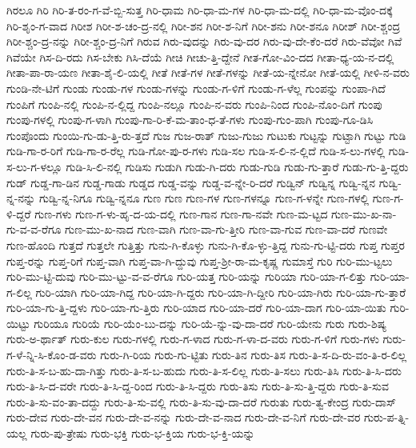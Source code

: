 {ಗಿರಲೂ
ಗಿರಿ
ಗಿರಿ-ತ-ರಂ-ಗ-ವೆ-ಬ್ಬಿ-ಸುತ್ತ
ಗಿರಿ-ಧಾಮ
ಗಿರಿ-ಧಾ-ಮ-ಗಳ
ಗಿರಿ-ಧಾ-ಮ-ದಲ್ಲಿ
ಗಿರಿ-ಧಾ-ಮ-ವೊಂ-ದಕ್ಕೆ
ಗಿರಿ-ಶೃಂ-ಗ-ವಾದ
ಗಿರೀಶ
ಗಿರೀ-ಶ-ಚಂ-ದ್ರ-ನಲ್ಲಿ
ಗಿರೀ-ಶನ
ಗಿರೀ-ಶ-ನಿಗೆ
ಗಿರೀ-ಶನು
ಗಿರೀ-ಶನೂ
ಗಿರೀಶ್
ಗಿರೀ-ಶ್ಚಂದ್ರ
ಗಿರೀ-ಶ್ಚಂ-ದ್ರ-ನನ್ನು
ಗಿರೀ-ಶ್ಚಂ-ದ್ರ-ನಿಗೆ
ಗಿರುವ
ಗಿರು-ವುದನ್ನು
ಗಿರು-ವು-ದರ
ಗಿರು-ವು-ದೇ-ಕೆಂ-ದರೆ
ಗಿರು-ವೆವೋ
ಗಿವೆ
ಗಿವೆಯೇ
ಗಿಸ-ದಿ-ರದು
ಗಿಸ-ಬೇಕು
ಗಿಸಿ-ದೆಯೆ
ಗೀಚಿ
ಗೀಚು-ತ್ತಿ-ದ್ದೇನೆ
ಗೀತ-ಗೋ-ವಿಂ-ದದ
ಗೀತಾ-ಧ್ಯ-ಯ-ನ-ದಲ್ಲಿ
ಗೀತಾ-ಪಾ-ರಾ-ಯಣ
ಗೀತಾ-ಶೈ-ಲಿ-ಯಲ್ಲಿ
ಗೀತೆ
ಗೀತೆ-ಗಳ
ಗೀತೆ-ಗಳನ್ನು
ಗೀತೆ-ಯ-ನ್ನೇನೋ
ಗೀತೆ-ಯಲ್ಲಿ
ಗೀಳಿ-ನ-ವರು
ಗುಂಡಿ-ನೇ-ಟಿಗೆ
ಗುಂಡು
ಗುಂಡು-ಗಳ
ಗುಂಡು-ಗಳನ್ನು
ಗುಂಡು-ಗ-ಳಿಗೆ
ಗುಂಡು-ಗ-ಳೆಲ್ಲ
ಗುಂಪನ್ನು
ಗುಂಪಾ-ಗಿದೆ
ಗುಂಪಿಗೆ
ಗುಂಪಿ-ನಲ್ಲಿ
ಗುಂಪಿ-ನ-ಲ್ಲಿದ್ದ
ಗುಂಪಿ-ನಲ್ಲೂ
ಗುಂಪಿ-ನ-ವರು
ಗುಂಪಿ-ನಿಂದ
ಗುಂಪಿ-ನೊಂ-ದಿಗೆ
ಗುಂಪು
ಗುಂಪು-ಗಳಲ್ಲಿ
ಗುಂಪು-ಗ-ಳಾಗಿ
ಗುಂಪು-ಗಾ-ರಿ-ಕೆ-ಮ-ತಾಂ-ಧ-ತೆ-ಗಳು
ಗುಂಪು-ಗುಂ-ಪಾಗಿ
ಗುಂಪು-ಗೂ-ಡಿಸಿ
ಗುಂಪೊಂದು
ಗುಂಯಿ-ಗು-ಡು-ತ್ತಿ-ರು-ತ್ತದೆ
ಗುಜ
ಗುಜ-ರಾತ್
ಗುಜು-ಗುಜು
ಗುಟುಕು
ಗುಟ್ಟನ್ನು
ಗುಟ್ಟಾಗಿ
ಗುಟ್ಟು
ಗುಡಿ
ಗುಡಿ-ಗಾ-ರ-ರಿಗೆ
ಗುಡಿ-ಗಾ-ರ-ರೆಲ್ಲ
ಗುಡಿ-ಗೋ-ಪು-ರ-ಗಳು
ಗುಡಿ-ಸಲ
ಗುಡಿ-ಸ-ಲಿ-ನ-ಲ್ಲಿದೆ
ಗುಡಿ-ಸ-ಲು-ಗಳಲ್ಲಿ
ಗುಡಿ-ಸ-ಲು-ಗ-ಳಲ್ಲೂ
ಗುಡಿ-ಸಿ-ಲಿ-ನಲ್ಲಿ
ಗುಡಿಸು
ಗುಡುಗಿ
ಗುಡು-ಗಿ-ದರು
ಗುಡು-ಗುಡಿ
ಗುಡು-ಗು-ತ್ತಾರೆ
ಗುಡು-ಗು-ತ್ತಿ-ದ್ದರು
ಗುಡ್
ಗುಡ್ಡ-ಗಾ-ಡಿನ
ಗುಡ್ಡ-ಗಾಡು
ಗುಡ್ಡದ
ಗುಡ್ಡ-ವನ್ನು
ಗುಡ್ಡ-ವ-ನ್ನೇ-ರಿ-ದರೆ
ಗುಡ್ವಿನ್
ಗುಡ್ವಿನ್ನ
ಗುಡ್ವಿ-ನ್ನನ
ಗುಡ್ವಿ-ನ್ನ-ನನ್ನು
ಗುಡ್ವಿ-ನ್ನ-ನಿಗೂ
ಗುಡ್ವಿ-ನ್ನನೂ
ಗುಣ
ಗುಣ
ಗುಣ-ಗಳ
ಗುಣ-ಗಳನ್ನೂ
ಗುಣ-ಗ-ಳನ್ನೇ
ಗುಣ-ಗಳಲ್ಲಿ
ಗುಣ-ಗ-ಳಿ-ದ್ದರೆ
ಗುಣ-ಗಳು
ಗುಣ-ಗ-ಳು-ಹೃ-ದ-ಯ-ದಲ್ಲಿ
ಗುಣ-ಗಾನ
ಗುಣ-ಗಾ-ನವೇ
ಗುಣ-ಮ-ಟ್ಟದ
ಗುಣ-ಮು-ಖ-ನಾ-ಗು-ವ-ವ-ರೆಗೂ
ಗುಣ-ಮು-ಖ-ನಾದ
ಗುಣ-ವಾಗಿ
ಗುಣ-ವಾ-ಗು-ತ್ತೀರಿ
ಗುಣ-ವಾ-ಗುವ
ಗುಣ-ವಾ-ದರೆ
ಗುಣವೇ
ಗುಣ-ಹೊಂದಿ
ಗುತ್ತದೆ
ಗುತ್ತಲೇ
ಗುತ್ತಿತ್ತು
ಗುನು-ಗಿ-ಕೊಳ್ಳು
ಗುನು-ಗಿ-ಕೊ-ಳ್ಳು-ತ್ತಿದ್ದ
ಗುನು-ಗು-ಟ್ಟಿ-ದರು
ಗುಪ್ತ
ಗುಪ್ತರ
ಗುಪ್ತ-ರನ್ನು
ಗುಪ್ತ-ರಿಗೆ
ಗುಪ್ತ-ವಾಗಿ
ಗುಪ್ತ-ವಾ-ಗಿ-ದ್ದುವು
ಗುಪ್ತ-ಶ್ರೀ-ರಾ-ಮ-ಕೃಷ್ಣ
ಗುಮಾಸ್ತೆ
ಗುರಿ
ಗುರಿ-ಮು-ಟ್ಟಲು
ಗುರಿ-ಮು-ಟ್ಟಿ-ದುವು
ಗುರಿ-ಮು-ಟ್ಟು-ವ-ವ-ರೆಗೂ
ಗುರಿ-ಯತ್ತ
ಗುರಿ-ಯನ್ನು
ಗುರಿಯಾ
ಗುರಿ-ಯಾ-ಗ-ಲಿತ್ತು
ಗುರಿ-ಯಾ-ಗ-ಲಿಲ್ಲ
ಗುರಿ-ಯಾಗಿ
ಗುರಿ-ಯಾ-ಗಿದ್ದ
ಗುರಿ-ಯಾ-ಗಿ-ದ್ದರು
ಗುರಿ-ಯಾ-ಗಿ-ದ್ದೀರಿ
ಗುರಿ-ಯಾ-ಗಿರು
ಗುರಿ-ಯಾ-ಗು-ತ್ತಾರೆ
ಗುರಿ-ಯಾ-ಗು-ತ್ತಿ-ದ್ದಳು
ಗುರಿ-ಯಾ-ಗು-ತ್ತಿರು
ಗುರಿ-ಯಾದ
ಗುರಿ-ಯಾ-ದರೆ
ಗುರಿ-ಯಾ-ದಾಗ
ಗುರಿ-ಯಾ-ಯಿತು
ಗುರಿ-ಯಿಟ್ಟು
ಗುರಿಯೂ
ಗುರಿಯೆ
ಗುರಿ-ಯೆಂ-ಬು-ದನ್ನು
ಗುರಿ-ಯೆ-ನ್ನು-ವು-ದಾ-ದರೆ
ಗುರಿ-ಯೇನು
ಗುರು
ಗುರು-ಶಿಷ್ಯ
ಗುರು-ಅ-ರ್ಥಾತ್
ಗುರು-ಕುಲ
ಗುರು-ಗಳಲ್ಲಿ
ಗುರು-ಗ-ಳಾದ
ಗುರು-ಗ-ಳಾ-ದ-ವರು
ಗುರು-ಗ-ಳಿಗೆ
ಗುರು-ಗಳು
ಗುರು-ಗ-ಳೆ-ನ್ನಿ-ಸಿ-ಕೊಂ-ಡ-ವರು
ಗುರು-ಗಿ-ರಿಯ
ಗುರು-ಗು-ಟ್ಟಿತು
ಗುರು-ತಿನ
ಗುರು-ತಿಸ
ಗುರು-ತಿ-ಸ-ದಿ-ರು-ವಂ-ತಿ-ರ-ಲಿಲ್ಲ
ಗುರು-ತಿ-ಸ-ಬ-ಹು-ದಾ-ಗಿತ್ತು
ಗುರು-ತಿ-ಸ-ಬ-ಹುದು
ಗುರು-ತಿ-ಸ-ಲಿಲ್ಲ
ಗುರು-ತಿ-ಸಲು
ಗುರು-ತಿಸಿ
ಗುರು-ತಿ-ಸಿ-ದರು
ಗುರು-ತಿ-ಸಿ-ದ-ವರೇ
ಗುರು-ತಿ-ಸಿ-ದ್ದ-ರಿಂದ
ಗುರು-ತಿ-ಸಿ-ದ್ದರು
ಗುರು-ತಿಸು
ಗುರು-ತಿ-ಸು-ತ್ತಿ-ದ್ದರು
ಗುರು-ತಿ-ಸುವ
ಗುರು-ತಿ-ಸು-ವಂ-ತಾ-ದದ್ದು
ಗುರು-ತಿ-ಸು-ವಲ್ಲಿ
ಗುರು-ತಿ-ಸು-ವು-ದಾ-ದರೆ
ಗುರುತು
ಗುರು-ತ್ವ-ಕೇಂದ್ರ
ಗುರು-ದಾಸ್
ಗುರು-ದೇವ
ಗುರು-ದೇ-ವನ
ಗುರು-ದೇ-ವ-ನನ್ನು
ಗುರು-ದೇ-ವ-ನಾದ
ಗುರು-ದೇ-ವ-ನಿಗೆ
ಗುರು-ದೇ-ವರ
ಗುರು-ಪ-ತ್ನಿ-ಯಲ್ಲ
ಗುರು-ಪು-ತ್ರೇಷು
ಗುರು-ಭಕ್ತಿ
ಗುರು-ಭ-ಕ್ತಿಯ
ಗುರು-ಭ-ಕ್ತಿ-ಯನ್ನು
}
